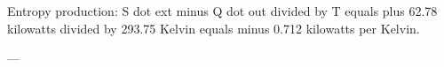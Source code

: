 Entropy production:  
S dot ext minus Q dot out divided by T equals plus 62.78 kilowatts divided by 293.75 Kelvin equals minus 0.712 kilowatts per Kelvin.  

---